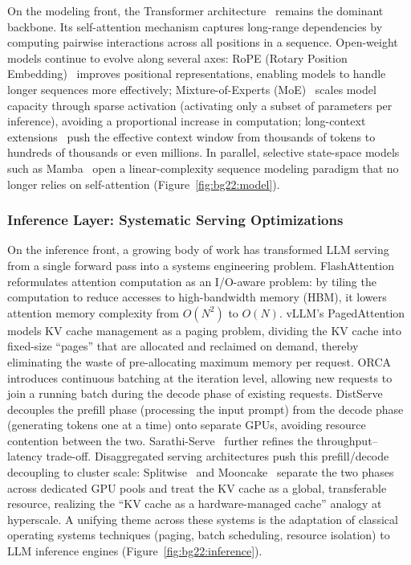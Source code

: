 On the modeling front, the Transformer architecture~\cite{vaswani2017attention} remains the dominant backbone.
Its self-attention mechanism captures long-range dependencies by computing pairwise interactions across all positions in a sequence.
Open-weight models continue to evolve along several axes: RoPE (Rotary Position Embedding)~\cite{su2021roformer} improves positional representations, enabling models to handle longer sequences more effectively; Mixture-of-Experts (MoE)~\cite{switch2022,mixtral2024} scales model capacity through sparse activation (activating only a subset of parameters per inference), avoiding a proportional increase in computation; long-context extensions~\cite{yarn2024,longrope2024} push the effective context window from thousands of tokens to hundreds of thousands or even millions.
In parallel, selective state-space models such as Mamba~\cite{gu2024mamba} open a linear-complexity sequence modeling paradigm that no longer relies on self-attention (Figure~\ref{fig:bg22:model}).


\subsubsection{Inference Layer: Systematic Serving Optimizations}

On the inference front, a growing body of work has transformed LLM serving from a single forward pass into a systems engineering problem.
FlashAttention~\cite{dao2022flashattention,dao2023flashattention2} reformulates attention computation as an I/O-aware problem: by tiling the computation to reduce accesses to high-bandwidth memory (HBM), it lowers attention memory complexity from $O(N^2)$ to $O(N)$.
vLLM's PagedAttention~\cite{kwon2023pagedattention} models KV cache management as a paging problem, dividing the KV cache into fixed-size ``pages'' that are allocated and reclaimed on demand, thereby eliminating the waste of pre-allocating maximum memory per request.
ORCA~\cite{orca2022} introduces continuous batching at the iteration level, allowing new requests to join a running batch during the decode phase of existing requests.
DistServe~\cite{zhong2024distserve} decouples the prefill phase (processing the input prompt) from the decode phase (generating tokens one at a time) onto separate GPUs, avoiding resource contention between the two.
Sarathi-Serve~\cite{agrawal2024sarathi} further refines the throughput--latency trade-off.
Disaggregated serving architectures push this prefill/decode decoupling to cluster scale: Splitwise~\cite{patel2024splitwise} and Mooncake~\cite{qin2024mooncake} separate the two phases across dedicated GPU pools and treat the KV cache as a global, transferable resource, realizing the ``KV cache as a hardware-managed cache'' analogy at hyperscale.
A unifying theme across these systems is the adaptation of classical operating systems techniques (paging, batch scheduling, resource isolation) to LLM inference engines (Figure~\ref{fig:bg22:inference}).


